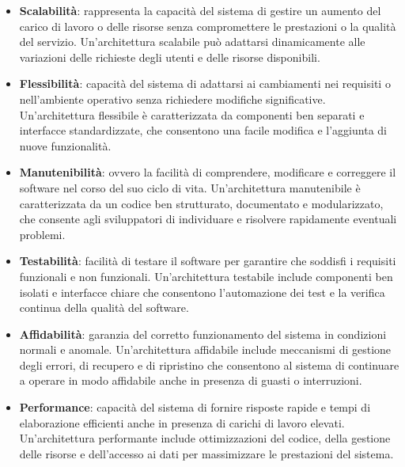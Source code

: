 \begin{itemize}
	\item \textbf{Scalabilità}: rappresenta la capacità del sistema di gestire un aumento del carico di lavoro o delle risorse senza compromettere le prestazioni o la qualità del servizio. Un'architettura scalabile può adattarsi dinamicamente alle variazioni delle richieste degli utenti e delle risorse disponibili.
	\item \textbf{Flessibilità}: capacità del sistema di adattarsi ai cambiamenti nei requisiti o nell'ambiente operativo senza richiedere modifiche significative. Un'architettura flessibile è caratterizzata da componenti ben separati e interfacce standardizzate, che consentono una facile modifica e l'aggiunta di nuove funzionalità.
	\item \textbf{Manutenibilità}: ovvero la facilità di comprendere, modificare e correggere il software nel corso del suo ciclo di vita. Un'architettura manutenibile è caratterizzata da un codice ben strutturato, documentato e modularizzato, che consente agli sviluppatori di individuare e risolvere rapidamente eventuali problemi.
	\item \textbf{Testabilità}: facilità di testare il software per garantire che soddisfi i requisiti funzionali e non funzionali. Un'architettura testabile include componenti ben isolati e interfacce chiare che consentono l'automazione dei test e la verifica continua della qualità del software.
	\item \textbf{Affidabilità}: garanzia del corretto funzionamento del sistema in condizioni normali e anomale. Un'architettura affidabile include meccanismi di gestione degli errori, di recupero e di ripristino che consentono al sistema di continuare a operare in modo affidabile anche in presenza di guasti o interruzioni.
	\item \textbf{Performance}: capacità del sistema di fornire risposte rapide e tempi di elaborazione efficienti anche in presenza di carichi di lavoro elevati. Un'architettura performante include ottimizzazioni del codice, della gestione delle risorse e dell'accesso ai dati per massimizzare le prestazioni del sistema.

\end{itemize}
